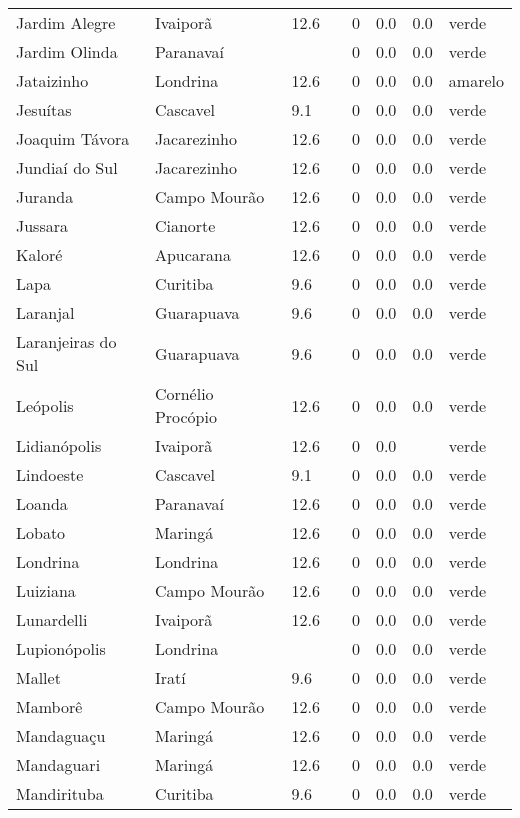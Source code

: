 \begin{longtable}{l|lllllll}
  Jardim Alegre & Ivaiporã & 12.6 &  & 0 & 0.0 & 0.0 & verde \\ 
  Jardim Olinda & Paranavaí &  &  & 0 & 0.0 & 0.0 & verde \\ 
  Jataizinho & Londrina & 12.6 &  & 0 & 0.0 & 0.0 & amarelo \\ 
  Jesuítas & Cascavel & 9.1 &  & 0 & 0.0 & 0.0 & verde \\ 
  Joaquim Távora & Jacarezinho & 12.6 &  & 0 & 0.0 & 0.0 & verde \\ 
  Jundiaí do Sul & Jacarezinho & 12.6 &  & 0 & 0.0 & 0.0 & verde \\ 
  Juranda & Campo Mourão & 12.6 &  & 0 & 0.0 & 0.0 & verde \\ 
  Jussara & Cianorte & 12.6 &  & 0 & 0.0 & 0.0 & verde \\ 
  Kaloré & Apucarana & 12.6 &  & 0 & 0.0 & 0.0 & verde \\ 
  Lapa & Curitiba & 9.6 &  & 0 & 0.0 & 0.0 & verde \\ 
  Laranjal & Guarapuava & 9.6 &  & 0 & 0.0 & 0.0 & verde \\ 
  Laranjeiras do Sul & Guarapuava & 9.6 &  & 0 & 0.0 & 0.0 & verde \\ 
  Leópolis & Cornélio Procópio & 12.6 &  & 0 & 0.0 & 0.0 & verde \\ 
  Lidianópolis & Ivaiporã & 12.6 &  & 0 & 0.0 &  & verde \\ 
  Lindoeste & Cascavel & 9.1 &  & 0 & 0.0 & 0.0 & verde \\ 
  Loanda & Paranavaí & 12.6 &  & 0 & 0.0 & 0.0 & verde \\ 
  Lobato & Maringá & 12.6 &  & 0 & 0.0 & 0.0 & verde \\ 
  Londrina & Londrina & 12.6 &  & 0 & 0.0 & 0.0 & verde \\ 
  Luiziana & Campo Mourão & 12.6 &  & 0 & 0.0 & 0.0 & verde \\ 
  Lunardelli & Ivaiporã & 12.6 &  & 0 & 0.0 & 0.0 & verde \\ 
  Lupionópolis & Londrina &  &  & 0 & 0.0 & 0.0 & verde \\ 
  Mallet & Iratí & 9.6 &  & 0 & 0.0 & 0.0 & verde \\ 
  Mamborê & Campo Mourão & 12.6 &  & 0 & 0.0 & 0.0 & verde \\ 
  Mandaguaçu & Maringá & 12.6 &  & 0 & 0.0 & 0.0 & verde \\ 
  Mandaguari & Maringá & 12.6 &  & 0 & 0.0 & 0.0 & verde \\ 
  Mandirituba & Curitiba & 9.6 &  & 0 & 0.0 & 0.0 & verde \\ 

\end{longtable}
